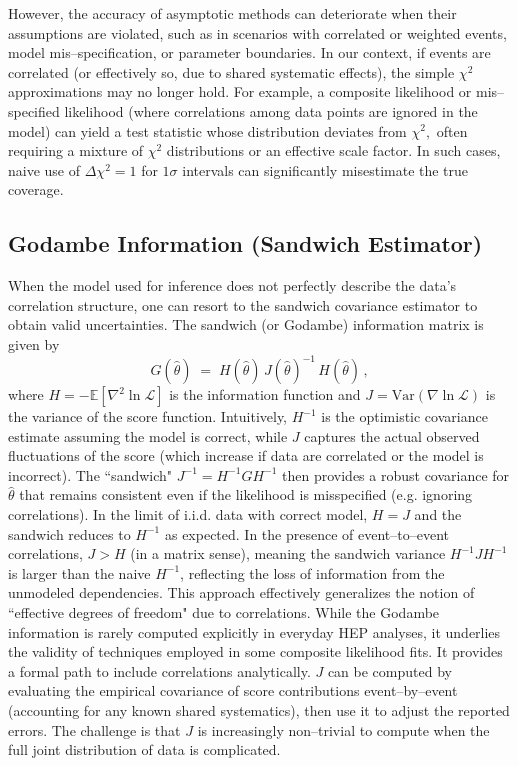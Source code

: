        However, the accuracy of asymptotic methods can deteriorate when their assumptions are violated, such as in scenarios with correlated or weighted events, model mis--specification, or parameter boundaries.
        In our context, if events are correlated (or effectively so, due to shared systematic effects), the simple $\chi^2$ approximations may no longer hold.
        For example, a composite likelihood or mis--specified likelihood (where correlations among data points are ignored in the model) can yield a test statistic whose distribution deviates from $\chi^2,$ often requiring a mixture of $\chi^2$ distributions or an effective scale factor.
        In such cases, naive use of $\Delta\chi^2=1$ for $1\sigma$ intervals can significantly misestimate the true coverage.

        \subsection{Godambe Information (Sandwich Estimator)}
            When the model used for inference does not perfectly describe the data's correlation structure, one can resort to the sandwich covariance estimator to obtain valid uncertainties.
            The sandwich (or Godambe) information matrix is given by
            \[
                G(\hat{\theta}) \;=\; H(\hat{\theta})\, J(\hat{\theta})^{-1}\, H(\hat{\theta}) \,,
            \]
            where $H = -\mathbb{E}[\nabla^2 \ln \mathcal{L}]$ is the information function and $J = \mathrm{Var}(\nabla \ln \mathcal{L})$ is the variance of the score function.
            Intuitively, $H^{-1}$ is the optimistic covariance estimate assuming the model is correct, while $J$ captures the actual observed fluctuations of the score (which increase if data are correlated or the model is incorrect).
            The ``sandwich" $J^{-1} = H^{-1} G H^{-1}$ then provides a robust covariance for $\hat{\theta}$ that remains consistent even if the likelihood is misspecified (e.g. ignoring correlations).
            In the limit of i.i.d. data with correct model, $H=J$ and the sandwich reduces to $H^{-1}$ as expected.
            In the presence of event--to--event correlations, $J > H$ (in a matrix sense), meaning the sandwich variance $H^{-1}JH^{-1}$ is larger than the naive $H^{-1}$, reflecting the loss of information from the unmodeled dependencies.
            This approach effectively generalizes the notion of ``effective degrees of freedom" due to correlations.
            While the Godambe information is rarely computed explicitly in everyday HEP analyses, it underlies the validity of techniques employed in some composite likelihood fits.
            It provides a formal path to include correlations analytically.
            $J$ can be computed by evaluating the empirical covariance of score contributions event--by--event (accounting for any known shared systematics), then use it to adjust the reported errors.
            The challenge is that $J$ is increasingly non--trivial to compute when the full joint distribution of data is complicated.


